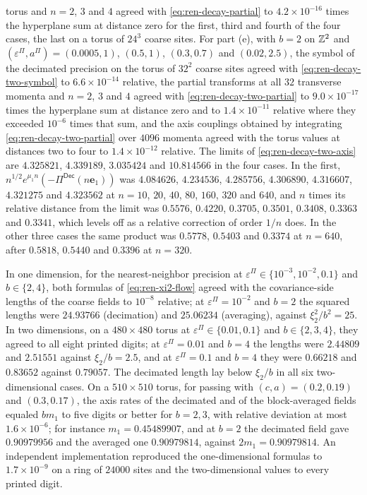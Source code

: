 \begin{numcheck}
torus and $n=2$, $3$ and $4$ agreed with \eqref{eq:ren-decay-partial} to $4.2\times10^{-16}$ times the hyperplane sum at distance zero for the first, third and fourth of the four cases, the last on a torus of $24^3$ coarse sites. For part (e), with $b=2$ on $\mathbb{Z}^2$ and $(\varepsilon^\Pi,a^\Pi)=(0.0005,1)$, $(0.5,1)$, $(0.3,0.7)$ and $(0.02,2.5)$, the symbol of the decimated precision on the torus of $32^2$ coarse sites agreed with \eqref{eq:ren-decay-two-symbol} to $6.6\times10^{-14}$ relative, the partial transforms at all $32$ transverse momenta and $n=2$, $3$ and $4$ agreed with \eqref{eq:ren-decay-two-partial} to $9.0\times10^{-17}$ times the hyperplane sum at distance zero and to $1.4\times10^{-11}$ relative where they exceeded $10^{-6}$ times that sum, and the axis couplings obtained by integrating \eqref{eq:ren-decay-two-partial} over $4096$ momenta agreed with the torus values at distances two to four to $1.4\times10^{-12}$ relative. The limits of \eqref{eq:ren-decay-two-axis} are $4.325821$, $4.339189$, $3.035424$ and $10.814566$ in the four cases. In the first, $n^{1/2}e^{\mu_1n}(-\Pi^{\mathsf{Dec}}(n\mathbf e_1))$ was $4.084626$, $4.234536$, $4.285756$, $4.306890$, $4.316607$, $4.321275$ and $4.323562$ at $n=10$, $20$, $40$, $80$, $160$, $320$ and $640$, and $n$ times its relative distance from the limit was $0.5576$, $0.4220$, $0.3705$, $0.3501$, $0.3408$, $0.3363$ and $0.3341$, which levels off as a relative correction of order $1/n$ does. In the other three cases the same product was $0.5778$, $0.5403$ and $0.3374$ at $n=640$, after $0.5818$, $0.5440$ and $0.3396$ at $n=320$.
\end{numcheck}

\begin{numcheck}\label{chk:ren-flows}
In one dimension, for the nearest-neighbor precision at $\varepsilon^\Pi\in\{10^{-3},10^{-2},0.1\}$ and $b\in\{2,4\}$, both formulas of \eqref{eq:ren-xi2-flow} agreed with the covariance-side lengths of the coarse fields to $10^{-8}$ relative; at $\varepsilon^\Pi=10^{-2}$ and $b=2$ the squared lengths were $24.93766$ (decimation) and $25.06234$ (averaging), against $\xi_2^2/b^2=25$. In two dimensions, on a $480\times480$ torus at $\varepsilon^\Pi\in\{0.01,0.1\}$ and $b\in\{2,3,4\}$, they agreed to all eight printed digits; at $\varepsilon^\Pi=0.01$ and $b=4$ the lengths were $2.44809$ and $2.51551$ against $\xi_2/b=2.5$, and at $\varepsilon^\Pi=0.1$ and $b=4$ they were $0.66218$ and $0.83652$ against $0.79057$. The decimated length lay below $\xi_2/b$ in all six two-dimensional cases. On a $510\times510$ torus, for passing with $(c,a)=(0.2,0.19)$ and $(0.3,0.17)$, the axis rates of the decimated and of the block-averaged fields equaled $bm_1$ to five digits or better for $b=2,3$, with relative deviation at most $1.6\times10^{-6}$; for instance $m_1=0.45489907$, and at $b=2$ the decimated field gave $0.90979956$ and the averaged one $0.90979814$, against $2m_1=0.90979814$. An independent implementation reproduced the one-dimensional formulas to $1.7\times10^{-9}$ on a ring of $24000$ sites and the two-dimensional values to every printed digit.
\end{numcheck}

